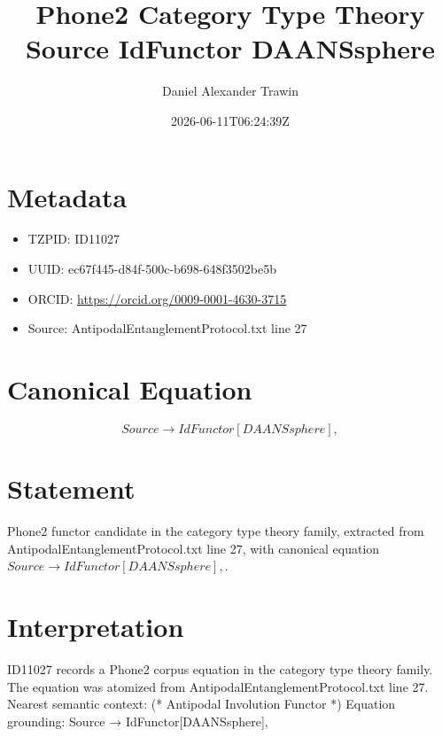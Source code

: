 \documentclass[11pt]{article}
\title{Phone2 Category Type Theory Source IdFunctor DAANSsphere}
\author{Daniel Alexander Trawin}
\date{2026-06-11T06:24:39Z}
\begin{document}
\maketitle
\section*{Metadata}
\begin{itemize}
\item TZPID: ID11027
\item UUID: ec67f445-d84f-500c-b698-648f3502be5b
\item ORCID: \url{https://orcid.org/0009-0001-4630-3715}
\item Source: AntipodalEntanglementProtocol.txt line 27
\end{itemize}
\section*{Canonical Equation}
\[
Source → IdFunctor[DAANSsphere],
\]
\section*{Statement}
Phone2 functor candidate in the category type theory family, extracted from AntipodalEntanglementProtocol.txt line 27, with canonical equation $Source → IdFunctor[DAANSsphere],$.
\section*{Interpretation}
ID11027 records a Phone2 corpus equation in the category type theory family. The equation was atomized from AntipodalEntanglementProtocol.txt line 27. Nearest semantic context: (* Antipodal Involution Functor *) Equation grounding: Source → IdFunctor[DAANSsphere],
\end{document}
